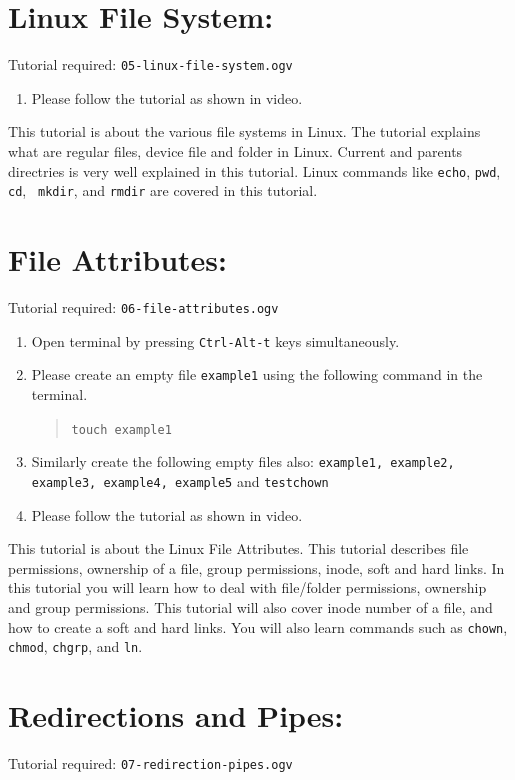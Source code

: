 \documentclass[11pt]{article}
\newenvironment{enumcpt}{\begin{enumerate} \topsep 0pt \partopsep 0pt 
                        \parsep 0pt
                        \itemsep 0pt \leftmargin -1in \rightmargin 0pt
                        }{\end{enumerate}}
\begin{document}
\begin{multicols}{2}
\section{Linux File System:}
Tutorial required: {\tt 05-linux-file-system.ogv} 
\begin{enumcpt}
\item Please follow the tutorial as shown in video.
\end{enumcpt}
This tutorial is about the various file systems in Linux. The
tutorial explains what are regular files, device file and folder in
Linux. Current and parents directries is very well explained in this
tutorial. Linux commands like {\tt echo}, {\tt pwd}, {\tt cd}, {\tt
  mkdir}, and {\tt rmdir} are covered in this tutorial.

\section{File Attributes:}
Tutorial required: {\tt 06-file-attributes.ogv} 

\begin{enumcpt}
\item Open terminal by pressing {\tt Ctrl-Alt-t} keys simultaneously.
\item Please create an empty file {\tt example1} using the following
  command in the terminal.
\begin{quote}
{\tt touch example1}
\end{quote}
\item Similarly create the following empty files also: {\tt example1,
example2, example3, example4, example5} and {\tt testchown}
\item Please follow the tutorial as shown in video.
\end{enumcpt}

This tutorial is about the Linux File Attributes. This tutorial
describes file permissions, ownership of a file, group permissions,
inode, soft and hard links. In this tutorial you will learn how to
deal with file/folder permissions, ownership and group
permissions. This tutorial will also cover inode number of a file, and
how to create a soft and hard links. You will also learn commands such
as {\tt chown}, {\tt chmod}, {\tt chgrp}, and {\tt ln}.

\section{Redirections and Pipes:}
Tutorial required: {\tt 07-redirection-pipes.ogv} 


\end{multicols}
\end{document}
